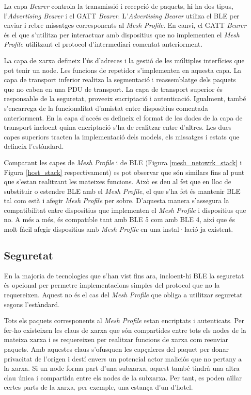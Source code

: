 La capa \textit{Bearer} controla la transmissió i recepció de paquets, hi ha dos tipus, l'\textit{Advertising Bearer} i el GATT \textit{Bearer}.
L'\textit{Advertising Bearer} utiliza el BLE per enviar i rebre missatges corresponents al \textit{Mesh Profile}.
En canvi, el GATT \textit{Bearer} és el que s'utilitza per interactuar amb dispositius que no implementen el \textit{Mesh Profile} utilitzant el protocol d'intermediari comentat anteriorment.

La capa de xarxa defineix l'ús d'adreces i la gestió de les múltiples interfícies que pot tenir un node.
Les funcions de repetidor s'implementen en aquesta capa.
La capa de transport inferior realitza la segmentació i reassemblatge dels paquets que no caben en una PDU de transport.
La capa de transport superior és responsable de la seguretat, proveeix encriptació i autenticació.
Igualment, també s'encarrega de la funcionalitat d'amistat entre dispositius comentada anteriorment.
En la capa d'accés es defineix el format de les dades de la capa de transport incloent quina encriptació s'ha de realitzar entre d'altres.
Les dues capes superiors tracten la implementació dels models, els missatges i estats que defineix l'estàndard.

Comparant les capes de \textit{Mesh Profile} i de BLE (Figura \ref{mesh_netowrk_stack} i Figura \ref{host_stack} respectivament) es pot observar que són similars fins al punt que s'estan realitzant les mateixes funcions.
Això es deu al fet que en lloc de substituir o estendre BLE amb el \textit{Mesh Profile}, el que s'ha fet és mantenir BLE tal com està i afegir \textit{Mesh Profile} per sobre.
D'aquesta manera s'assegura la compatibilitat entre dispositius que implementen el \textit{Mesh Profile} i dispositius que no.
A més a més, és compatible tant amb BLE 5 com amb BLE 4, així que és molt fàcil afegir dispositius amb \textit{Mesh Profile} en una instal·lació ja existent.

\subsection{Seguretat}
En la majoria de tecnologies que s'han vist fins ara, incloent-hi BLE la seguretat és opcional per permetre implementacions simples del protocol que no la requereixen.
Aquest no és el cas del \textit{Mesh Profile} que obliga a utilitzar seguretat segons l'estàndard.

Tots els paquets corresponents al \textit{Mesh Profile} estan encriptats i autenticats.
Per fer-ho existeixen les claus de xarxa que són compartides entre tots els nodes de la mateixa xarxa i es requereixen per realitzar funcions de xarxa com reenviar paquets.
Amb aquestes claus s'ofusquen les capçaleres del paquet per donar privacitat de l'origen i destí envers un potencial actor maliciós que no pertany a la xarxa.
Si un node forma part d'una subxarxa, aquest també tindrà una altra clau única i compartida entre els nodes de la subxarxa.
Per tant, es poden aïllar certes parts de la xarxa, per exemple, una estança d'un d'hotel.

